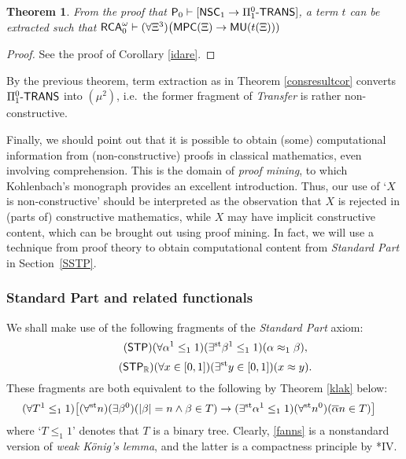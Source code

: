 \documentclass[reqno]{amsart}
\newtheorem{thm}{Theorem}
\newcommand\be{\begin{equation}}
\newcommand\ee{\end{equation}}
\def\STP{\textup{\textsf{STP}}}
\def\RCAo{\textup{\textsf{RCA}}_{0}^{\omega}}
\def\P{\textup{\textsf{P}}}
\def\R{{\mathbb  R}}
\def\R{{\mathbb{R}}}
\def\st{\textup{st}}
\def\di{\rightarrow}
\def\paai{\Pi_{1}^{0}\textup{-\textsf{TRANS}}}
\def\MPC{\textup{\textsf{MPC}}}
\def\NSC{\textup{\textsf{NSC}}}
\def\MU{\textup{\textsf{MU}}}
\numberwithin{equation}{section}
\numberwithin{thm}{section}
\begin{document}
\begin{thm}\label{idare2}
From the proof that $\P_{0}\vdash[ \NSC_{1}\di \paai]$, a term $t$ can be extracted such that $\RCAo\vdash (\forall \Xi^{3})\big(\MPC(\Xi)\di \MU(t(\Xi)))$
\end{thm}
\begin{proof}
See the proof of Corollary \ref{idare}.  
\end{proof}
By the previous theorem, term extraction as in Theorem \ref{consresultcor} converts $\paai$ into $(\mu^{2})$, i.e.\ the former fragment of \emph{Transfer} is rather non-constructive.  

\medskip

Finally, we should point out that it is possible to obtain (some) computational information from (non-constructive) proofs in classical mathematics, even involving comprehension.  This is the domain of \emph{proof mining}, to which Kohlenbach's monograph \cite{kohlenbach3} provides an excellent introduction.  Thus, our use of `$X$ is non-constructive' should be interpreted as the observation that $X$ is rejected in (parts of) constructive mathematics, while $X$ may have implicit constructive content, which can be brought out using proof mining.  In fact, we will use a technique from proof theory to obtain computational content from \emph{Standard Part} in Section~\ref{SSTP}.    

%
\subsubsection{Standard Part and related functionals}\label{firstkol}
We shall make use of the following fragments of the \emph{Standard Part} axiom:
\be\label{STP}\tag{\textsf{STP}}
(\forall \alpha^{1}\leq_{1}1)(\exists^{\st} \beta^{1}\leq_{1}1)(\alpha\approx_{1} \beta),
\ee
\be\label{STPR}\tag{$\textsf{\textup{STP}}_{\R}$}
(\forall x\in [0,1])(\exists^{\st}y\in [0,1])(x\approx y).  
\ee
These fragments are both equivalent to the following by Theorem \ref{klak} below:
\begin{align}\label{fanns}
(\forall T^{1}\leq_{1}1)\big[(\forall^{\st}n)(\exists \beta^{0})&(|\beta|=n \wedge \beta\in T ) \di (\exists^{\st}\alpha^{1}\leq_{1}1)(\forall^{\st}n^{0})(\overline{\alpha}n\in T)   \big]
\end{align}
where `$T\leq_{1}1$' denotes that $T$ is a binary tree.  
Clearly, \eqref{fanns} is a nonstandard version of \emph{weak K\"onig's lemma}, and the latter is a compactness principle by \cite{simpson2}*{IV}. 
\end{document}
